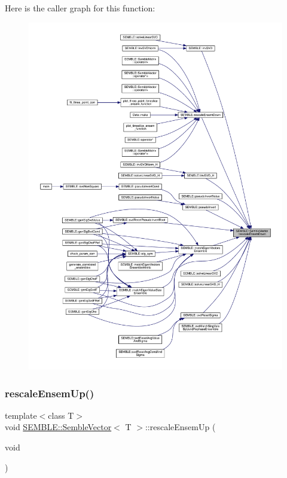 Here is the caller graph for this function\+:
\nopagebreak
\begin{figure}[H]
\begin{center}
\leavevmode
\includegraphics[width=350pt]{d9/d94/structSEMBLE_1_1SembleVector_acda114b0659e31c0130b4b6eb0d4701d_icgraph}
\end{center}
\end{figure}
\mbox{\label{structSEMBLE_1_1SembleVector_ade3ccfd44ba282c06bf32c0a1c800d2f}} 
\subsubsection{\texorpdfstring{rescaleEnsemUp()}{rescaleEnsemUp()}\hspace{0.1cm}{\footnotesize\ttfamily [1/2]}}
{\footnotesize\ttfamily template$<$class T$>$ \\
void \mbox{\hyperlink{structSEMBLE_1_1SembleVector}{S\+E\+M\+B\+L\+E\+::\+Semble\+Vector}}$<$ T $>$\+::rescale\+Ensem\+Up (\begin{DoxyParamCaption}\item[{void}]{ }\end{DoxyParamCaption})\hspace{0.3cm}{\ttfamily [inline]}}

